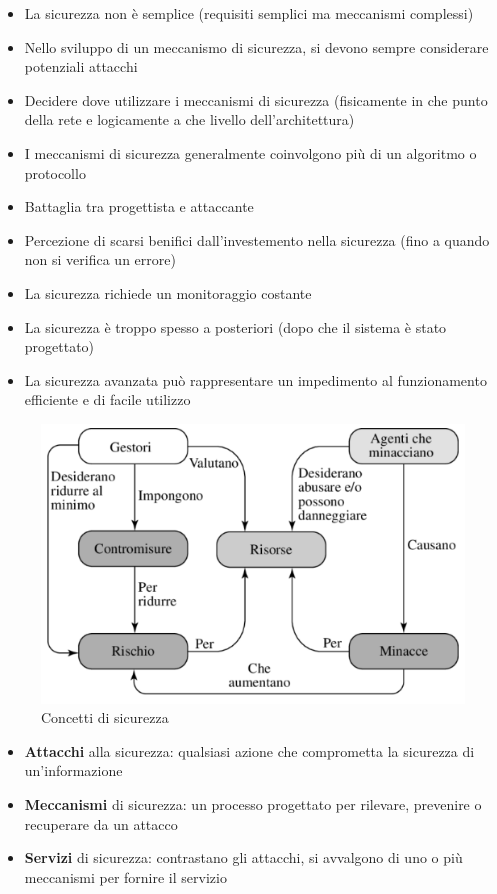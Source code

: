 \begin{itemize}
    \item La sicurezza non è semplice (requisiti semplici ma meccanismi complessi)
    \item Nello sviluppo di un meccanismo di sicurezza, si devono sempre considerare potenziali attacchi
    \item Decidere dove utilizzare i meccanismi di sicurezza (fisicamente in che punto della rete e logicamente a che livello dell'architettura)
    \item I meccanismi di sicurezza generalmente coinvolgono più di un algoritmo o protocollo
    \item Battaglia tra progettista e attaccante
    \item Percezione di scarsi benifici dall'investemento nella sicurezza (fino a quando non si verifica un errore)
    \item La sicurezza richiede un monitoraggio costante
    \item La sicurezza è troppo spesso a posteriori (dopo che il sistema è stato progettato)
    \item La sicurezza avanzata può rappresentare un impedimento al funzionamento efficiente e di facile utilizzo
\end{itemize}

\begin{figure}[h]
    \centering
    \includegraphics[width=0.95\linewidth]{chapters/images1/sicurezza.png}
    \caption{Concetti di sicurezza}
    \label{fig:sec}
\end{figure}

\begin{itemize}
    \item \textbf{Attacchi} alla sicurezza: qualsiasi azione che comprometta la sicurezza di un'informazione
    \item \textbf{Meccanismi} di sicurezza: un processo progettato per rilevare, prevenire o recuperare da un attacco
    \item \textbf{Servizi} di sicurezza: contrastano gli attacchi, si avvalgono di uno o più meccanismi per fornire il servizio
\end{itemize}

